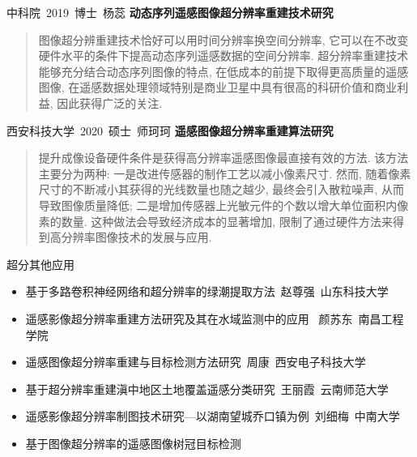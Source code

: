 \begin{frame}{中科院\ 2019\ 博士\ 杨蕊}
    \textbf{动态序列遥感图像超分辨率重建技术研究}\\[1cm]

    \begin{quotation}
        图像超分辨重建技术恰好可以用时间分辨率换空间分辨率, 它可以在不改变硬件水平的条件下提高动态序列遥感数据的空间分辨率. 超分辨率重建技术能够充分结合动态序列图像的特点, 在低成本的前提下取得更高质量的遥感图像, 在遥感数据处理领域特别是商业卫星中具有很高的科研价值和商业利益, 因此获得广泛的关注.
    \end{quotation}
\end{frame}

\begin{frame}{西安科技大学\ 2020\ 硕士\ 师珂珂}
    \textbf{遥感图像超分辨率重建算法研究}\\[1cm]

    \begin{quotation}
        提升成像设备硬件条件是获得高分辨率遥感图像最直接有效的方法. 该方法主要分为两种: 一是改进传感器的制作工艺以减小像素尺寸. 然而, 随着像素尺寸的不断减小其获得的光线数量也随之越少, 最终会引入散粒噪声, 从而导致图像质量降低; 二是增加传感器上光敏元件的个数以增大单位面积内像素的数量. 这种做法会导致经济成本的显著增加, 限制了通过硬件方法来得到高分辨率图像技术的发展与应用.
    \end{quotation}
\end{frame}

\begin{frame}{超分其他应用}
    \begin{itemize}
        \item 基于多路卷积神经网络和超分辨率的绿潮提取方法\	赵尊强\ 山东科技大学
        \item 遥感影像超分辨率重建方法研究及其在水域监测中的应用	\ 颜苏东\ 南昌工程学院
        \item 遥感图像超分辨率重建与目标检测方法研究\ 周康\	西安电子科技大学
        \item 	基于超分辨率重建滇中地区土地覆盖遥感分类研究\ 王丽霞\ 云南师范大学
        \item 遥感影像超分辨率制图技术研究---以湖南望城乔口镇为例\ 刘细梅\ 中南大学
        \item 基于图像超分辨率的遥感图像树冠目标检测
    \end{itemize}
\end{frame}

